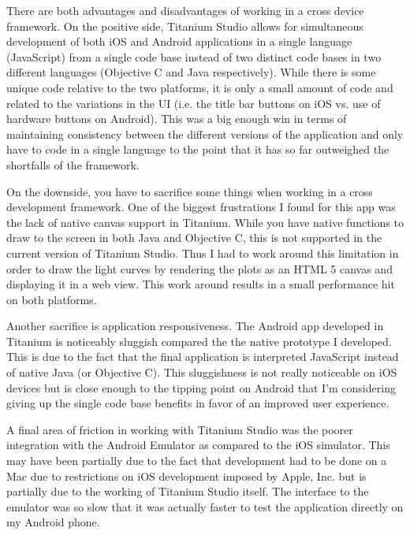 \documentclass[11pt,twoside]{article}
\begin{document}
There are both advantages and disadvantages of working in a cross device framework.  On the positive side, Titanium Studio allows for simultaneous development of both iOS and Android applications in a single language (JavaScript) from a single code base instead of two distinct code bases in two different languages (Objective C and Java respectively).  While there is some unique code relative to the two platforms, it is only a small amount of code and related to the variations in the UI (i.e. the title bar buttons on iOS vs. use of hardware buttons on Android).  This was a big enough win in terms of maintaining consistency between the different versions of the application and only have to code in a single language to the point that it has so far outweighed the shortfalls of the framework.

On the downside, you have to sacrifice some things when working in a cross development framework.  One of the biggest frustrations I found for this app was the lack of native canvas support in Titanium.  While you have native functions to draw to the screen in both Java and Objective C, this is not supported in the current version of Titanium Studio.  Thus I had to work around this limitation in order to draw the light curves by rendering the plots as an HTML 5 canvas and displaying it in a web view.  This work around results in a small performance hit on both platforms.

Another sacrifice is application responsiveness.  The Android app developed in Titanium is noticeably sluggish compared the the native prototype I developed.  This is due to the fact that the final application is interpreted JavaScript instead of native Java (or Objective C).  This sluggishness is not really noticeable on iOS devices but is close enough to the tipping point on Android that I'm considering giving up the single code base benefits in favor of an improved user experience.

A final area of friction in working with Titanium Studio was the poorer integration with the Android Emulator as compared to the iOS simulator.  This may have been partially due to the fact that development had to be done on a Mac due to restrictions on iOS development imposed by Apple, Inc. but is partially due to the working of Titanium Studio itself.  The interface to the emulator was so slow that it was actually faster to test the application directly on my Android phone.
\end{document}
